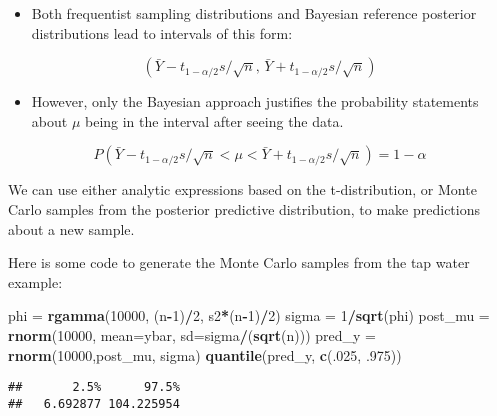 \documentclass[]{book}
\newenvironment{Shaded}{\begin{snugshade}}{\end{snugshade}}
\newcommand{\KeywordTok}[1]{\textcolor[rgb]{0.13,0.29,0.53}{\textbf{#1}}}
\newcommand{\DataTypeTok}[1]{\textcolor[rgb]{0.13,0.29,0.53}{#1}}
\newcommand{\DecValTok}[1]{\textcolor[rgb]{0.00,0.00,0.81}{#1}}
\newcommand{\StringTok}[1]{\textcolor[rgb]{0.31,0.60,0.02}{#1}}
\newcommand{\OperatorTok}[1]{\textcolor[rgb]{0.81,0.36,0.00}{\textbf{#1}}}
\newcommand{\NormalTok}[1]{#1}
\providecommand{\tightlist}{%
  \setlength{\itemsep}{0pt}\setlength{\parskip}{0pt}}
\theoremstyle{definition}
\theoremstyle{definition}
\theoremstyle{definition}
\theoremstyle{remark}
\begin{document}
\begin{itemize}
\tightlist
\item
  Both frequentist sampling distributions and Bayesian reference
  posterior distributions lead to intervals of this form:
\end{itemize}

\[(\bar{Y} - t_{1 - \alpha/2} s/\sqrt{n}, \, \bar{Y} + t_{1 - \alpha/2} s/\sqrt{n})\]

\begin{itemize}
\tightlist
\item
  However, only the Bayesian approach justifies the probability
  statements about \(\mu\) being in the interval after seeing the data.
\end{itemize}

\[P(\bar{Y} - t_{1 - \alpha/2} s/\sqrt{n} < \mu <  \bar{Y} + t_{1 - \alpha/2} s/\sqrt{n}) = 1 - \alpha\]

We can use either analytic expressions based on the t-distribution, or
Monte Carlo samples from the posterior predictive distribution, to make
predictions about a new sample.

Here is some code to generate the Monte Carlo samples from the tap water
example:

\begin{Shaded}
\begin{Highlighting}[]
\NormalTok{phi =}\StringTok{ }\KeywordTok{rgamma}\NormalTok{(}\DecValTok{10000}\NormalTok{, (n}\OperatorTok{-}\DecValTok{1}\NormalTok{)}\OperatorTok{/}\DecValTok{2}\NormalTok{, s2}\OperatorTok{*}\NormalTok{(n}\OperatorTok{-}\DecValTok{1}\NormalTok{)}\OperatorTok{/}\DecValTok{2}\NormalTok{)}
\NormalTok{sigma =}\StringTok{ }\DecValTok{1}\OperatorTok{/}\KeywordTok{sqrt}\NormalTok{(phi)}
\NormalTok{post_mu =}\StringTok{ }\KeywordTok{rnorm}\NormalTok{(}\DecValTok{10000}\NormalTok{, }\DataTypeTok{mean=}\NormalTok{ybar, }\DataTypeTok{sd=}\NormalTok{sigma}\OperatorTok{/}\NormalTok{(}\KeywordTok{sqrt}\NormalTok{(n)))}
\NormalTok{pred_y =}\StringTok{  }\KeywordTok{rnorm}\NormalTok{(}\DecValTok{10000}\NormalTok{,post_mu, sigma)}
\KeywordTok{quantile}\NormalTok{(pred_y, }\KeywordTok{c}\NormalTok{(.}\DecValTok{025}\NormalTok{, .}\DecValTok{975}\NormalTok{))}
\end{Highlighting}
\end{Shaded}

\begin{verbatim}
##       2.5%      97.5% 
##   6.692877 104.225954
\end{verbatim}
\end{document}
